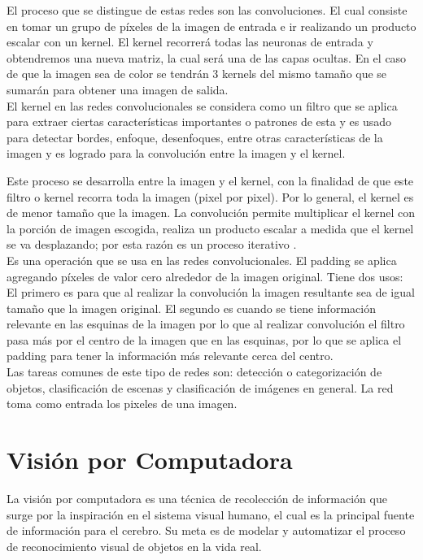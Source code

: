 El proceso que se distingue de estas redes son las convoluciones. El cual consiste en tomar un grupo de píxeles de la imagen de entrada e ir realizando un producto escalar con un kernel. El kernel recorrerá todas las neuronas de entrada y obtendremos una nueva matriz, la cual será una de las capas ocultas. En el caso de que la imagen sea de color se tendrán 3 kernels del mismo tamaño que se sumarán para obtener una imagen de salida.\\

El kernel en las redes convolucionales se considera como un filtro que se aplica para extraer ciertas características importantes o patrones de esta y es usado para detectar bordes, enfoque, desenfoques, entre otras características de la imagen y es logrado para la convolución entre la imagen y el kernel.

Este proceso se desarrolla entre la imagen y el kernel, con la finalidad de que este filtro o kernel recorra toda la imagen (pixel por pixel). Por lo general, el kernel es de menor tamaño que la imagen. La convolución permite multiplicar el kernel con la porción de imagen escogida, realiza un producto escalar a medida que el kernel se va desplazando; por esta razón es un proceso iterativo .\\

Es una operación que se usa en las redes convolucionales. El padding se aplica agregando píxeles de valor cero alrededor de la imagen original.
Tiene dos usos:
El primero es para que al realizar la convolución la imagen resultante sea de igual tamaño que la imagen original.
El segundo es cuando se tiene información relevante en las esquinas de la imagen por lo que al realizar convolución el filtro pasa más por el centro de la imagen que en las esquinas, por lo que se aplica el padding para tener la información más relevante cerca del centro.\\

Las tareas comunes de este tipo de redes son: detección o categorización de objetos, clasificación de escenas y clasificación de imágenes en general. La red toma como entrada los pixeles de una imagen. 


\section{Visión por Computadora}
La visión por computadora es una técnica de recolección de información que surge por la inspiración en el sistema visual humano, el cual es la principal fuente de información para el cerebro. Su meta es de modelar y automatizar el proceso de reconocimiento visual de objetos en la vida real.\\


